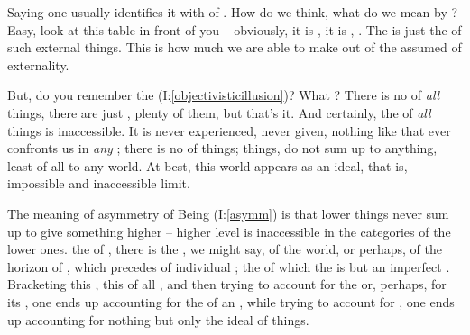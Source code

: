 
\pa Saying  one usually identifies it with 
of . How do we think, what do we mean by ?
Easy, look at this table in front of you -- obviously, it is , it is
, . The  is just the  of
such external things. This is how much we are able to make out of the assumed
 of externality.

But, do you remember the 
(I:\ref{objectivisticillusion})?  What ?  There is no 
of {\em all} things, there are just , plenty of them, but
that's it.  And certainly, the  of {\em all} things is
inaccessible.  It is never experienced, never given, nothing like that ever
confronts us in {\em any} ; there is no  of
things; things,  do not sum up to anything, least of all to any
world.  At best, this world appears as an ideal, that is, impossible and
inaccessible limit.

The meaning of asymmetry of Being (I:\ref{asymm}) is that lower things
never sum up to give something higher -- higher level is inaccessible in the
categories of the lower ones.  the  of ,
there is the , we might say, of the world, or perhaps, of
the horizon of , which precedes  of individual
; the  of which the  is but an
imperfect .  Bracketing this , this  of all
, and then trying to account for the  or,
perhaps, for its , one ends up accounting for the
 of an , while trying to account for ,
one ends up accounting for nothing but only  the ideal
 of things. 

